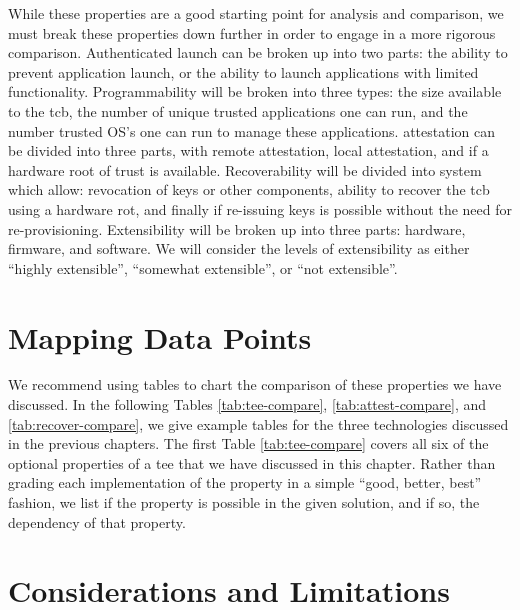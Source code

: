While these properties are a good starting point for analysis and comparison, we must break these properties down further in order to engage in a more rigorous comparison. Authenticated launch can be broken up into two parts: the ability to prevent application launch, or the ability to launch applications with limited functionality. Programmability will be broken into three types: the size available to the \gls{tcb}, the number of unique trusted applications one can run, and the number trusted OS's one can run to manage these applications. \Gls{attestation} can be divided into three parts, with remote attestation, local attestation, and if a hardware root of trust is available. Recoverability will be divided into system which allow: revocation of keys or other components, ability to recover the \gls{tcb} using a hardware \gls{rot}, and finally if re-issuing keys is possible without the need for re-provisioning. Extensibility will be broken up into three parts: hardware, firmware, and software. We will consider the levels of extensibility as either ``highly extensible'', ``somewhat extensible'', or ``not extensible''.

\section{Mapping Data Points}

We recommend using tables to chart the comparison of these properties we have discussed. In the following Tables \ref{tab:tee-compare}, \ref{tab:attest-compare}, and \ref{tab:recover-compare}, we give example tables for the three technologies discussed in the previous chapters. The first Table \ref{tab:tee-compare} covers all six of the optional properties of a \gls{tee} that we have discussed in this chapter. Rather than grading each implementation of the property in a simple ``good, better, best'' fashion, we list if the property is possible in the given solution, and if so,  the dependency of that property.

\renewcommand{\arraystretch}{1}


\section{Considerations and Limitations}
